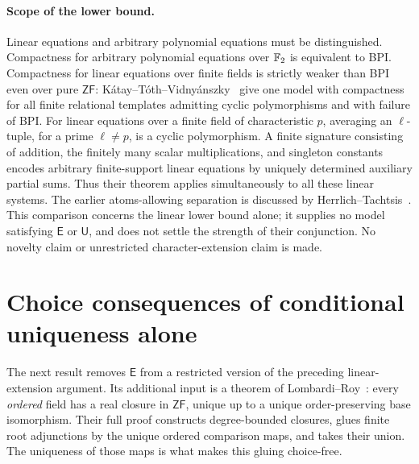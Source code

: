 \documentclass[11pt,a4paper]{article}
\theoremstyle{definition}\newtheorem{definition}[theorem]{Definition}
\theoremstyle{remark}\newtheorem{remark}[theorem]{Remark}
\newcommand{\ZF}{\mathsf{ZF}}\newcommand{\ZFA}{\mathsf{ZFA}}
\newcommand{\E}{\mathsf E}\newcommand{\U}{\mathsf U}
\begin{document}
\paragraph{Scope of the lower bound.}
Linear equations and arbitrary polynomial equations must be distinguished.
Compactness for arbitrary polynomial equations over $\mathbb F_2$ is equivalent
to BPI.  Compactness for linear equations over finite fields is strictly weaker than
BPI even over pure $\ZF$: K\'atay--T\'oth--Vidny\'anszky~\cite[Theorem~1.2]{KTV}
give one model with compactness for all finite relational templates
admitting cyclic polymorphisms and with failure of BPI.
For linear equations over a finite field of characteristic $p$, averaging
an $\ell$-tuple, for a prime $\ell\ne p$, is a cyclic polymorphism.
A finite signature consisting of addition, the finitely many scalar
multiplications, and singleton constants encodes arbitrary finite-support
linear equations by uniquely determined auxiliary partial sums.
Thus their theorem applies simultaneously to all these linear systems.
The earlier atoms-allowing separation is discussed by
Herrlich--Tachtsis~\cite[pp.~243--244]{HTlinear}.
This comparison concerns the linear lower bound alone; it supplies no
model satisfying $\E$ or $\U$, and does not settle the strength of their
conjunction.
No novelty claim or unrestricted character-extension claim is made.

\section{Choice consequences of conditional uniqueness alone}

The next result removes $\E$ from a restricted version of the preceding
linear-extension argument.  Its additional input is a theorem of
Lombardi--Roy~\cite[Theorem~12]{LR}: every \emph{ordered} field has a real
closure in $\ZF$, unique up to a unique order-preserving base isomorphism.
Their full proof constructs degree-bounded closures, glues finite root
adjunctions by the unique ordered comparison maps, and takes their union.
The uniqueness of those maps is what makes this gluing choice-free.
\end{document}
